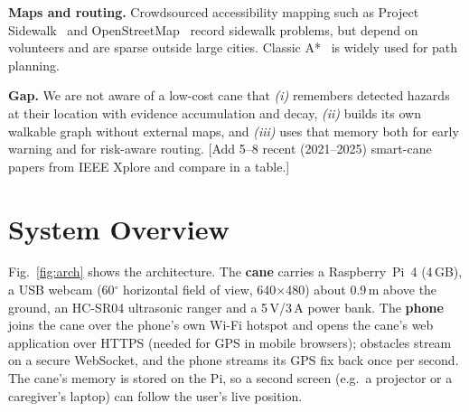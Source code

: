 \documentclass[conference]{IEEEtran}
\newcommand{\tbd}[1]{\textcolor{tbd}{[#1]}}
\begin{document}
\textbf{Maps and routing.} Crowdsourced accessibility mapping such as Project Sidewalk~\cite{saha2019} and OpenStreetMap~\cite{haklay2008} record sidewalk problems, but depend on volunteers and are sparse outside large cities. Classic A*~\cite{hart1968} is widely used for path planning.

\textbf{Gap.} We are not aware of a low-cost cane that \emph{(i)} remembers detected hazards at their location with evidence accumulation and decay, \emph{(ii)} builds its own walkable graph without external maps, and \emph{(iii)} uses that memory both for early warning and for risk-aware routing. \tbd{Add 5--8 recent (2021--2025) smart-cane papers from IEEE Xplore and compare in a table.}

\section{System Overview}\label{sec:system}
Fig.~\ref{fig:arch} shows the architecture. The \textbf{cane} carries a Raspberry~Pi~4 (4\,GB), a USB webcam (60$^\circ$ horizontal field of view, 640$\times$480) about 0.9\,m above the ground, an HC-SR04 ultrasonic ranger and a 5\,V/3\,A power bank. The \textbf{phone} joins the cane over the phone's own Wi-Fi hotspot and opens the cane's web application over HTTPS (needed for GPS in mobile browsers); obstacles stream on a secure WebSocket, and the phone streams its GPS fix back once per second. The cane's memory is stored on the Pi, so a second screen (e.g.\ a projector or a caregiver's laptop) can follow the user's live position.
\end{document}
